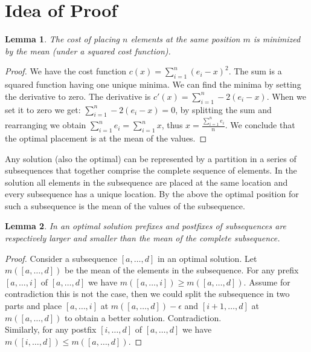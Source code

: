 \documentclass{article}
\newtheorem{lemma}{Lemma}
\begin{document}
\section*{Idea of Proof}


\begin{lemma}\label{lem:mean}
The cost of placing $n$ elements at the same position $m$ is minimized by the mean (under a squared cost function).
\end{lemma}
\begin{proof}
We have the cost function $c(x) = \sum_{i=1}^{n} (e_i - x)^2$. The sum is a squared function having one unique minima.
We can find the minima by setting the derivative to zero.
The derivative is $c'(x) = \sum_{i=1}^{n} -2(e_i - x)$. When we set it to zero we get: $\sum_{i=1}^{n} -2(e_i - x)=0$, by splitting the sum and rearranging we obtain $\sum_{i=1}^{n} e_i = \sum_{i=1}^{n} x$, thus $x = \frac{\sum_{i=1}^{n} e_i}{n}$. We conclude that the optimal placement is at the mean of the values.
\end{proof}

\noindent Any solution (also the optimal) can be represented by a partition in a series of subsequences that together comprise the complete sequence of elements. In the solution all elements in the subsequence are placed at the same location and every subsequence has a unique location. By the above the optimal position for such a subsequence is the mean of the values of the subsequence.\\

\begin{lemma}\label{lem:prepost}
In an optimal solution prefixes and postfixes of subsequences are respectively larger and smaller than the mean of the complete subsequence.
\end{lemma}
\begin{proof}
Consider a subsequence $[a,\ldots, d]$ in an optimal solution. Let $m([a,\ldots,d])$ be the mean of the elements in the subsequence.
For any prefix $[a,\ldots, i]$ of $[a,\ldots,d]$ we have $m([a,\ldots,i]) \ge m([a,\ldots,d])$. Assume for contradiction this is not the case, then we could split the subsequence in two parts and place $[a,\ldots,i]$ at $m([a,\ldots,d])-\epsilon$ and $[i+1,\ldots,d]$ at $m([a,\ldots,d])$ to obtain a better solution. Contradiction.\\
Similarly, for any postfix $[i,\ldots, d]$ of $[a,\ldots,d]$ we have $m([i,\ldots,d]) \le m([a,\ldots,d])$.
\end{proof}
\end{document}
